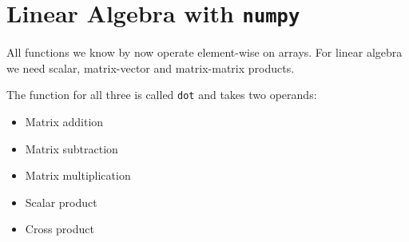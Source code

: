 \documentclass[numpymain.tex]{subfiles}
\begin{document}
\section{Linear Algebra with \texttt{numpy} }


All functions we know by now operate element-wise on arrays. For linear algebra we need scalar, matrix-vector and matrix-matrix products. 

The function for all three is called \texttt{dot} and takes two operands:


\begin{itemize}
\item Matrix addition
\item Matrix subtraction
\item Matrix multiplication
\item Scalar product
\item Cross product
\end{itemize}

\end{document}
